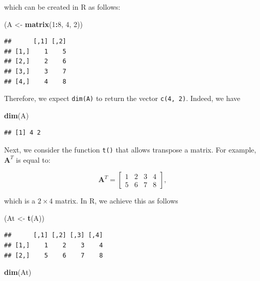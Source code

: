 \documentclass[12pt,]{krantz}
\newenvironment{Shaded}{\begin{snugshade}}{\end{snugshade}}
\newcommand{\KeywordTok}[1]{\textcolor[rgb]{0.27,0.27,0.27}{\textbf{#1}}}
\newcommand{\DecValTok}[1]{\textcolor[rgb]{0.06,0.06,0.06}{#1}}
\newcommand{\StringTok}[1]{\textcolor[rgb]{0.5,0.5,0.5}{#1}}
\newcommand{\OperatorTok}[1]{\textcolor[rgb]{0.43,0.43,0.43}{\textbf{#1}}}
\newcommand{\NormalTok}[1]{#1}
\begin{document}
which can be created in R as follows:

\begin{Shaded}
\begin{Highlighting}[]
\NormalTok{(A <-}\StringTok{ }\KeywordTok{matrix}\NormalTok{(}\DecValTok{1}\OperatorTok{:}\DecValTok{8}\NormalTok{, }\DecValTok{4}\NormalTok{, }\DecValTok{2}\NormalTok{))}
\end{Highlighting}
\end{Shaded}

\begin{verbatim}
##      [,1] [,2]
## [1,]    1    5
## [2,]    2    6
## [3,]    3    7
## [4,]    4    8
\end{verbatim}

Therefore, we expect \texttt{dim(A)} to return the vector
\texttt{c(4,\ 2)}. Indeed, we have

\begin{Shaded}
\begin{Highlighting}[]
\KeywordTok{dim}\NormalTok{(A)}
\end{Highlighting}
\end{Shaded}

\begin{verbatim}
## [1] 4 2
\end{verbatim}

Next, we consider the function \texttt{t()} that allows transpose a
matrix. For example, \(\mathbf{A}^T\) is equal to:

\begin{equation*}
\mathbf{A}^T = \left[
\begin{matrix}
1 & 2 & 3 & 4\\
5 & 6 & 7 & 8
\end{matrix}
\right],
\end{equation*}

which is a \(2 \times 4\) matrix. In R, we achieve this as follows

\begin{Shaded}
\begin{Highlighting}[]
\NormalTok{(At <-}\StringTok{ }\KeywordTok{t}\NormalTok{(A))}
\end{Highlighting}
\end{Shaded}

\begin{verbatim}
##      [,1] [,2] [,3] [,4]
## [1,]    1    2    3    4
## [2,]    5    6    7    8
\end{verbatim}

\begin{Shaded}
\begin{Highlighting}[]
\KeywordTok{dim}\NormalTok{(At)}
\end{Highlighting}
\end{Shaded}
\end{document}
